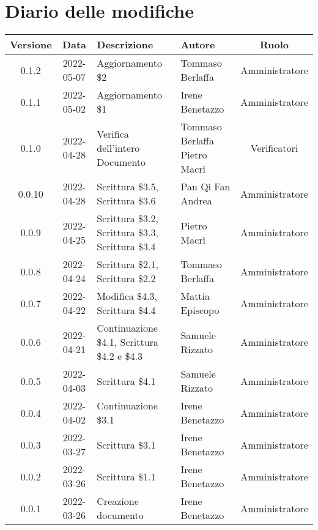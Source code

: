\section*{Diario delle modifiche}
	\begin{center}
	\renewcommand{\arraystretch}{1.8} %
	\begin{tabular}{ |c|c|m{12em}|m{7em}|c| }
	\hline
	\textbf{Versione} & \textbf{Data} & \textbf{Descrizione} &  \textbf{Autore} &  \textbf{Ruolo} \\ %
	\hline
	0.1.2 & 2022-05-07 & Aggiornamento \$2 & Tommaso Berlaffa & Amministratore\\
  \hline
	0.1.1 & 2022-05-02 & Aggiornamento \$1 & Irene Benetazzo & Amministratore\\
	\hline
	0.1.0 & 2022-04-28 & Verifica dell'intero Documento & Tommaso Berlaffa \newline Pietro Macrì & Verificatori\\
	\hline
	0.0.10 & 2022-04-28 & Scrittura \$3.5, Scrittura \$3.6 & Pan Qi Fan \newline Andrea & Amministratore\\
	\hline
	0.0.9 & 2022-04-25 & Scrittura \$3.2, Scrittura \$3.3, Scrittura \$3.4 & Pietro Macrì & Amministratore\\
	\hline
	0.0.8 & 2022-04-24 & Scrittura \$2.1, Scrittura \$2.2 & Tommaso \newline Berlaffa & Amministratore\\
	\hline
	0.0.7 & 2022-04-22 & Modifica \$4.3, Scrittura \$4.4 & Mattia \newline Episcopo & Amministratore\\
	\hline
	0.0.6 & 2022-04-21 & Continuazione \$4.1, Scrittura \$4.2 e \$4.3 & Samuele \newline Rizzato & Amministratore\\ %
	\hline
	0.0.5 & 2022-04-03 & Scrittura \$4.1 & Samuele \newline Rizzato & Amministratore\\
	\hline
	0.0.4 & 2022-04-02 & Continuazione \$3.1 & Irene Benetazzo & Amministratore\\
	\hline
	0.0.3 & 2022-03-27 & Scrittura \$3.1 & Irene Benetazzo & Amministratore\\
	\hline
	0.0.2 & 2022-03-26 & Scrittura \$1.1 & Irene Benetazzo & Amministratore\\
	\hline
    0.0.1 & 2022-03-26 & Creazione documento & Irene Benetazzo & Amministratore\\
	\hline
	\end{tabular}
	\end{center}
	\newpage